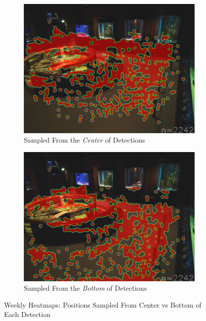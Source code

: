 \begin{figure}[H]
    \centering
    \begin{subfigure}{0.475\textwidth}
        \centering
        \includegraphics[width=\textwidth]{Images/Analytics/heatmap_center.jpg}
        \caption{Sampled From the \textit{Center} of Detections}
    \end{subfigure}
    \hfill
    \begin{subfigure}{0.475\textwidth}
        \centering
        \includegraphics[width=1\textwidth]{Images/Analytics/heatmap_bottom_center.jpg}
        \caption{Sampled From the \textit{Bottom} of Detections}
    \end{subfigure}
    \caption{Weekly Heatmaps: Positions Sampled From Center vs Bottom of Each Detection}
    \label{fig:heatmap_final}
\end{figure}

